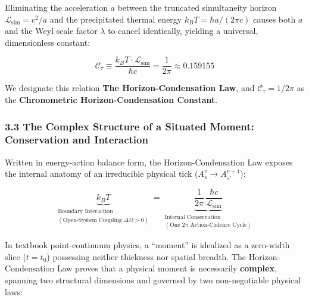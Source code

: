 \documentclass[
]{article}
\begin{document}
Eliminating the acceleration \(a\) between the truncated simultaneity
horizon \(\mathcal{L}_{\mathrm{sim}} = c^2 / a\) and the precipitated
thermal energy \(k_B T = \hbar a / (2\pi c)\) causes both \(a\) and the
Weyl scale factor \(\lambda\) to cancel identically, yielding a
universal, dimensionless constant:

\[\mathcal{C}_\tau \equiv \frac{k_B T \cdot \mathcal{L}_{\mathrm{sim}}}{\hbar c} = \frac{1}{2\pi} \approx 0.159155\]

We designate this relation \textbf{The Horizon-Condensation Law}, and
\(\mathcal{C}_\tau = 1/2\pi\) as the \textbf{Chronometric
Horizon-Condensation Constant}.

\subsubsection{3.3 The Complex Structure of a Situated Moment:
Conservation and
Interaction}\label{the-complex-structure-of-a-situated-moment-conservation-and-interaction}

Written in energy-action balance form, the Horizon-Condensation Law
exposes the internal anatomy of an irreducible physical tick
(\(A_s^v \to A_{s'}^{v+1}\)):

\[\underbrace{k_B T}_{\substack{\text{Boundary Interaction} \\ (\text{Open-System Coupling } \Delta\Omega > 0)}} = \underbrace{\frac{1}{2\pi}\,\frac{\hbar c}{\mathcal{L}_{\mathrm{sim}}}}_{\substack{\text{Internal Conservation} \\ (\text{One } 2\pi \text{ Action-Cadence Cycle})}}\]

In textbook point-continuum physics, a ``moment'' is idealized as a
zero-width slice (\(t = t_0\)) possessing neither thickness nor spatial
breadth. The Horizon-Condensation Law proves that a physical moment is
necessarily \textbf{complex}, spanning two structural dimensions and
governed by two non-negotiable physical laws:
\end{document}
